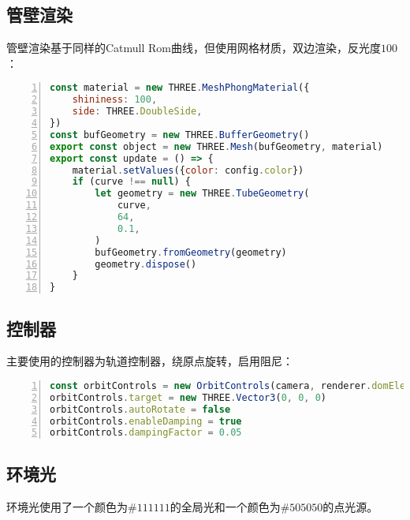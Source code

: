 \subsection{管壁渲染}

管壁渲染基于同样的Catmull Rom曲线，但使用网格材质，双边渲染，反光度$100$：

\begin{lstlisting}[language=JavaScript,
   backgroundcolor=\color{lightgray},
   extendedchars=true,
   basicstyle=\footnotesize\ttfamily,
   showstringspaces=false,
   showspaces=false,
   numbers=left,
   numberstyle=\footnotesize,
   numbersep=9pt,
   tabsize=2,
   breaklines=true,
   showtabs=false,
   captionpos=b]
const material = new THREE.MeshPhongMaterial({
    shininess: 100,
    side: THREE.DoubleSide,
})
const bufGeometry = new THREE.BufferGeometry()
export const object = new THREE.Mesh(bufGeometry, material)
export const update = () => {
    material.setValues({color: config.color})
    if (curve !== null) {
        let geometry = new THREE.TubeGeometry(
            curve,
            64,
            0.1,
        )
        bufGeometry.fromGeometry(geometry)
        geometry.dispose()
    }
}
\end{lstlisting}

\subsection{控制器}

主要使用的控制器为轨道控制器，绕原点旋转，启用阻尼：

\begin{lstlisting}[language=JavaScript,
   backgroundcolor=\color{lightgray},
   extendedchars=true,
   basicstyle=\footnotesize\ttfamily,
   showstringspaces=false,
   showspaces=false,
   numbers=left,
   numberstyle=\footnotesize,
   numbersep=9pt,
   tabsize=2,
   breaklines=true,
   showtabs=false,
   captionpos=b]
const orbitControls = new OrbitControls(camera, renderer.domElement)
orbitControls.target = new THREE.Vector3(0, 0, 0)
orbitControls.autoRotate = false
orbitControls.enableDamping = true
orbitControls.dampingFactor = 0.05
\end{lstlisting}

\subsection{环境光}

环境光使用了一个颜色为$\#111111$的全局光和一个颜色为$\#505050$的点光源。

